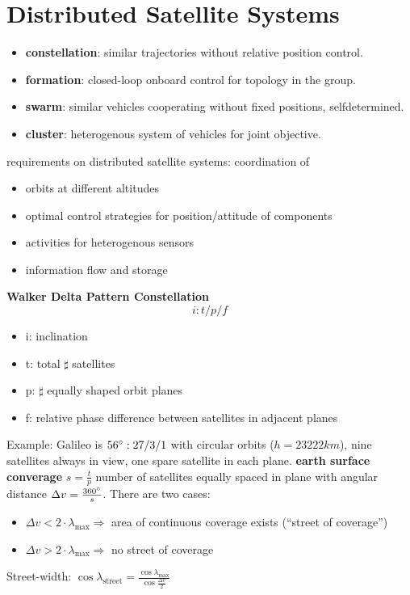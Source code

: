 \documentclass[a4paper,10pt]{article}
\newcommand{\f}{\textbf}
\begin{document}
\section{Distributed Satellite Systems}
\begin{itemize}
 \item \f{constellation}: similar trajectories without relative position control.
 \item \f{formation}: closed-loop onboard control for topology in the group.
 \item \f{swarm}: similar vehicles cooperating without fixed positions, selfdetermined.
 \item \f{cluster}: heterogenous system of vehicles for joint objective.
\end{itemize}
requirements on distributed satellite systems: coordination of
\begin{itemize}
 \item orbits at different altitudes
 \item optimal control strategies for position/attitude of components
 \item activities for heterogenous sensors
 \item information flow and storage
\end{itemize}
\f{Walker Delta Pattern Constellation}
\[ i: t/p/f \]
\begin{itemize}
 \item i: inclination
 \item t: total $\sharp$ satellites
 \item p: $\sharp$ equally shaped orbit planes
 \item f: relative phase difference between satellites in adjacent planes
\end{itemize}
Example: Galileo is $56\degree: 27/3/1$ with circular orbits ($h =23222km$), nine satellites always in view, one spare satellite in each plane.
\f{earth surface converage}
$ s = \frac{t}{p}$ number of satellites equally spaced in plane with angular distance $\Delta v = \frac{360\degree}{s}$. There are two cases:
\begin{itemize}
 \item $\Delta v < 2\cdot \lambda_\text{max} \Rightarrow$ area of continuous coverage exists (``street of coverage'')
 \item $\Delta v > 2\cdot \lambda_\text{max} \Rightarrow$ no street of coverage
\end{itemize}
Street-width: $\cos \lambda_\text{street} = \frac{\cos\lambda_\text{max}}{\cos\frac{\Delta v}{2}}$
\end{document}
